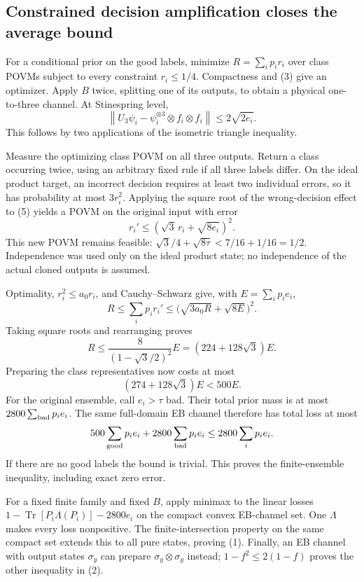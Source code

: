 \documentclass[11pt]{article}
\newcommand{\Tr}{\operatorname{Tr}}
\newcommand{\norm}[1]{\left\lVert#1\right\rVert}
\begin{document}
\subsection{Constrained decision amplification closes the average bound}

For a conditional prior on the good labels, minimize $R=\sum_i p_i r_i$ over class POVMs subject to every constraint $r_i\le1/4$. Compactness and (3) give an optimizer. Apply $B$ twice, splitting one of its outputs, to obtain a physical one-to-three channel. At Stinespring level,
\[
\norm{U_3\psi_i-\psi_i^{\otimes3}\otimes f_i\otimes f_i}
\le2\sqrt{2e_i}.\tag{5}
\]
This follows by two applications of the isometric triangle inequality.

Measure the optimizing class POVM on all three outputs. Return a class occurring twice, using an arbitrary fixed rule if all three labels differ. On the ideal product target, an incorrect decision requires at least two individual errors, so it has probability at most $3r_i^2$. Applying the square root of the wrong-decision effect to (5) yields a POVM on the original input with error
\[
r_i'\le(\sqrt3\,r_i+\sqrt{8e_i})^2.\tag{6}
\]
This new POVM remains feasible: $\sqrt3/4+\sqrt{8\tau}<7/16+1/16=1/2$. Independence was used only on the ideal product state; no independence of the actual cloned outputs is assumed.

Optimality, $r_i^2\le a_0r_i$, and Cauchy--Schwarz give, with $E=\sum_i p_i e_i$,
\[
R\le\sum_i p_i r_i'
\le\bigl(\sqrt{3a_0R}+\sqrt{8E}\bigr)^2.
\]
Taking square roots and rearranging proves
\[
R\le\frac8{(1-\sqrt3/2)^2}E=(224+128\sqrt3)E.\tag{7}
\]
Preparing the class representatives now costs at most
\[
(274+128\sqrt3)E<500E.
\]
For the original ensemble, call $e_i>\tau$ bad. Their total prior mass is at most $2800\sum_{\rm bad}p_i e_i$. The same full-domain EB channel therefore has total loss at most
\[
500\sum_{\rm good}p_i e_i+2800\sum_{\rm bad}p_i e_i
\le2800\sum_i p_i e_i.
\]
If there are no good labels the bound is trivial. This proves the finite-ensemble inequality, including exact zero error.

For a fixed finite family and fixed $B$, apply minimax to the linear losses
$1-\Tr[P_i\Lambda(P_i)]-2800e_i$ on the compact convex EB-channel set. One $\Lambda$ makes every loss nonpositive. The finite-intersection property on the same compact set extends this to all pure states, proving (1). Finally, an EB channel with output states $\sigma_y$ can prepare $\sigma_y\otimes\sigma_y$ instead; $1-f^2\le2(1-f)$ proves the other inequality in (2).
\end{document}
